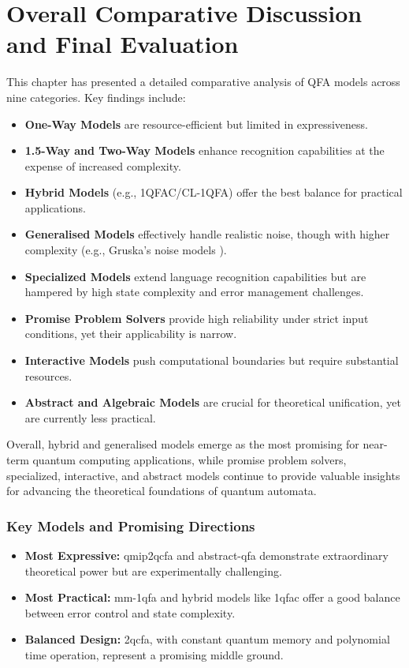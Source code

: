 \section{Overall Comparative Discussion and Final Evaluation}
This chapter has presented a detailed comparative analysis of QFA models across nine categories. Key findings include:
\begin{itemize}
    \item \textbf{One-Way Models} are resource-efficient but limited in expressiveness.
    \item \textbf{1.5-Way and Two-Way Models} enhance recognition capabilities at the expense of increased complexity.
    \item \textbf{Hybrid Models} (e.g., 1QFAC/CL-1QFA) offer the best balance for practical applications.
    \item \textbf{Generalised Models} effectively handle realistic noise, though with higher complexity (e.g., Gruska's noise models \cite{gruska2005}).
    \item \textbf{Specialized Models} extend language recognition capabilities but are hampered by high state complexity and error management challenges.
    \item \textbf{Promise Problem Solvers} provide high reliability under strict input conditions, yet their applicability is narrow.
    \item \textbf{Interactive Models} push computational boundaries but require substantial resources.
    \item \textbf{Abstract and Algebraic Models} are crucial for theoretical unification, yet are currently less practical.
\end{itemize}
Overall, hybrid and generalised models emerge as the most promising for near-term quantum computing applications, while promise problem solvers, specialized, interactive, and abstract models continue to provide valuable insights for advancing the theoretical foundations of quantum automata.

\subsubsection{Key Models and Promising Directions}
\begin{itemize}
    \item \textbf{Most Expressive:} \gls{qmip2qcfa} and \gls{abstract-qfa} demonstrate extraordinary theoretical power but are experimentally challenging.
    \item \textbf{Most Practical:} \gls{mm-1qfa} and hybrid models like \gls{1qfac} offer a good balance between error control and state complexity.
    \item \textbf{Balanced Design:} \gls{2qcfa}, with constant quantum memory and polynomial time operation, represent a promising middle ground.
\end{itemize}

